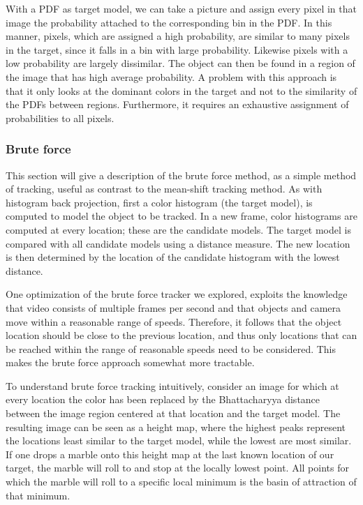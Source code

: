 \documentclass[a4paper,11pt]{article}
\begin{document}
With a PDF as target model, we can take a picture and assign every pixel in that image the probability attached to the corresponding bin in the PDF. In this manner, pixels, which are assigned a high probability, are similar to many pixels in the target, since it falls in a bin with large probability. Likewise pixels with a low probability are largely dissimilar. The object can then be found in a region of the image that has high average probability. A problem with this approach is that it only looks at the dominant colors in the target and not to the similarity of the PDFs between regions. Furthermore, it requires an exhaustive assignment of probabilities to all pixels.

\subsubsection{Brute force}
This section will give a description of the brute force method, as a simple method of tracking, useful as contrast to the mean-shift tracking method. As with histogram back projection, first a color histogram (the target model), is computed to model the object to be tracked. In a new frame, color histograms are computed at every location; these are the candidate models. The target model is compared with all candidate models using a distance measure. The new location is then determined by the location of the candidate histogram with the lowest distance.

One optimization of the brute force tracker we explored, exploits the knowledge that video consists of multiple frames per second and that objects and camera move within a reasonable range of speeds. Therefore, it follows that the object location should be close to the previous location, and thus only locations that can be reached within the range of reasonable speeds need to be considered. This makes the brute force approach somewhat more tractable. 

To understand brute force tracking intuitively, consider an image for which at every location the color has been replaced by the Bhattacharyya distance between the image region centered at that location and the target model. The resulting image can be seen as a height map, where the highest peaks represent the locations least similar to the target model, while the lowest are most similar. If one drops a marble onto this height map at the last known location of our target, the marble will roll to and stop at the locally lowest point. All points for which the marble will roll to a specific local minimum is the basin of attraction of that minimum. 
\end{document}
